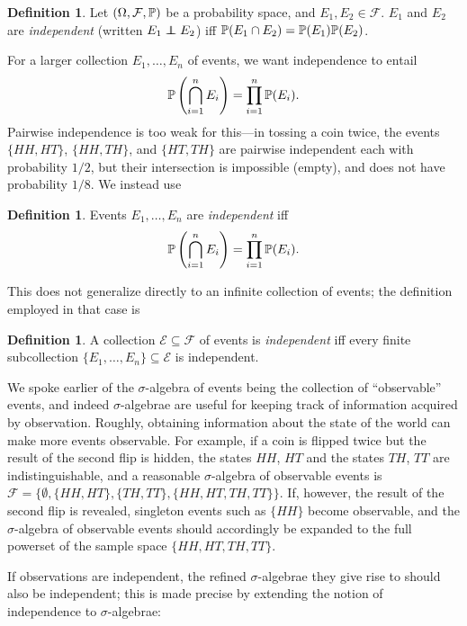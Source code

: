 \documentclass[leqno]{article}
\theoremstyle{definition}
\newtheorem{definition}[theorem]{Definition}
\newcommand\indep{\protect\mathpalette{\protect\independenT}{\perp}}
\def\independenT#1#2{\mathrel{\rlap{$#1#2$}\mkern2mu{#1#2}}}
\begin{document}
\begin{definition}
Let $(\Omega, \mathcal F, \P)$ be a probability space, and $E_1, E_2 \in \mathcal F$. $E_1$ and $E_2$ are {\em independent} (written $E_1 \indep E_2$) iff $\P(E_1 \cap E_2) = \P(E_1) \P(E_2)$.
\end{definition}

For a larger collection $E_1, \ldots, E_n$ of events, we want independence to entail
\[ \P\left(\bigcap_{i=1}^n E_i\right) = \prod_{i=1}^n \P(E_i). \]
Pairwise independence is too weak for this---in tossing a coin twice, the events $\{HH,HT\}$, $\{HH,TH\}$, and $\{HT,TH\}$ are pairwise independent each with probability $1/2$, but their intersection is impossible (empty), and does not have probability $1/8$. We instead use

\begin{definition}
Events $E_1, \ldots, E_n$ are {\em independent} iff
\[ \P\left(\bigcap_{i=1}^n E_i\right) = \prod_{i=1}^n \P(E_i). \]
\end{definition}

This does not generalize directly to an infinite collection of events; the definition employed in that case is

\begin{definition}
A collection $\mathcal E \subseteq \mathcal F$ of events is {\em independent} iff every finite subcollection $\{E_1, \ldots, E_n\} \subseteq \mathcal E$ is independent.
\end{definition}

We spoke earlier of the $\sigma$-algebra of events being the collection of ``observable'' events, and indeed $\sigma$-algebrae are useful for keeping track of information acquired by observation. Roughly, obtaining information about the state of the world can make more events observable. For example, if a coin is flipped twice but the result of the second flip is hidden, the states $HH$, $HT$ and the states $TH$, $TT$ are indistinguishable, and a reasonable $\sigma$-algebra of observable events is $\mathcal F = \{\emptyset, \{HH, HT\},\{TH, TT\}, \{HH, HT, TH, TT\}\}$. If, however, the result of the second flip is revealed, singleton events such as $\{HH\}$ become observable, and the $\sigma$-algebra of observable events should accordingly be expanded to the full powerset of the sample space $\{HH, HT, TH, TT\}$.

If observations are independent, the refined $\sigma$-algebrae they give rise to should also be independent; this is made precise by extending the notion of independence to $\sigma$-algebrae:
\end{document}

